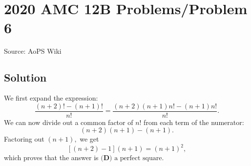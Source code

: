 \documentclass[12pt]{article}
\begin{document}
\section*{{2020 AMC 12B Problems/Problem 6}}
Source: AoPS Wiki

\subsection*{Solution}
We first expand the expression: \[\frac{(n+2)!-(n+1)!}{n!} = \frac{(n+2)(n+1)n!-(n+1)n!}{n!}.\] We can now divide out a common factor of $n!$ from each term of the numerator: \[(n+2)(n+1)-(n+1).\] Factoring out $(n+1),$ we get \[[(n+2)-1](n+1) = (n+1)^2,\] which proves that the answer is $\boxed{\textbf{(D) } \text{a perfect square}}.$
\end{document}
